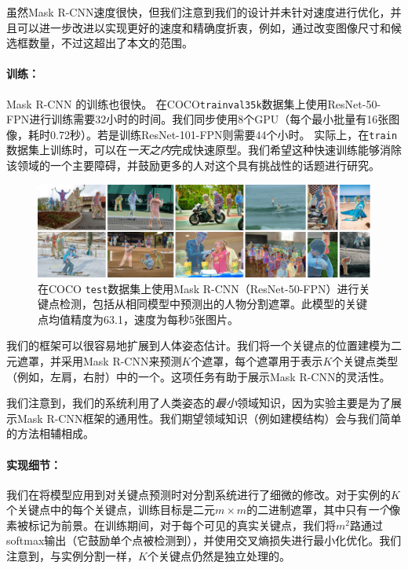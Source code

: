 虽然Mask R-CNN速度很快，但我们注意到我们的设计并未针对速度进行优化，并且可以进一步改进以实现更好的速度和精确度折衷，例如，通过改变图像尺寸和候选框数量，不过这超出了本文的范围。

\paragraph{训练：} Mask R-CNN 的训练也很快。 在COCO\texttt{trainval35k}数据集上使用ResNet-50-FPN进行训练需要32小时的时间。我们同步使用8个GPU（每个最小批量有16张图像，耗时0.72秒）。若是训练ResNet-101-FPN则需要44个小时。 实际上，在\texttt{train}数据集上训练时，可以在\emph{一天之内}完成快速原型。我们希望这种快速训练能够消除该领域的一个主要障碍，并鼓励更多的人对这个具有挑战性的话题进行研究。

\begin{figure}[t]
\centering
\includegraphics[width=1.0\linewidth]{figures/mask_rcnn/results_keypoints}
\caption{在COCO \texttt{test}数据集上使用Mask R-CNN（ResNet-50-FPN）进行关键点检测，包括从相同模型中预测出的人物分割遮罩。此模型的关键点均值精度为63.1，速度为每秒5张图片。}
\label{fig:results_keypoints}
\end{figure}

\label{sec:keypoints}

我们的框架可以很容易地扩展到人体姿态估计。我们将一个关键点的位置建模为二元遮罩，并采用Mask R-CNN来预测$K$个遮罩，每个遮罩用于表示$K$个关键点类型（例如，左肩，右肘）中的一个。这项任务有助于展示Mask R-CNN的灵活性。

我们注意到，我们的系统利用了人类姿态的\emph{最小}领域知识，因为实验主要是为了展示Mask R-CNN框架的通用性。我们期望领域知识（例如建模结构）会与我们简单的方法相辅相成。

\paragraph{实现细节：} 我们在将模型应用到对关键点预测时对分割系统进行了细微的修改。对于实例的$K$个关键点中的每个关键点，训练目标是二元$m\times m$的二进制遮罩，其中只有\emph{一个}像素被标记为前景。在训练期间，对于每个可见的真实关键点，我们将$m^2$路通过softmax输出（它鼓励单个点被检测到），并使用交叉熵损失进行最小化优化。我们注意到，与实例分割一样，$K$个关键点仍然是独立处理的。

